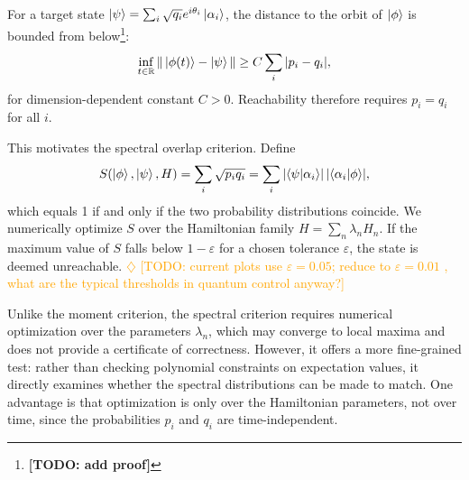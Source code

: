 \documentclass[aps,prx,reprint,superscriptaddress,footnote, twocolumn,notitlepage]{revtex4-2}
\newcommand{\ko}[1]{\textcolor{orange}{#1}}
\newcommand{\todoko}[1]{\ko{$\diamondsuit$ #1}}
\begin{document}
For a target state $\ket{\psi} = \sum_i \sqrt{q_i} e^{i\theta_i} \ket{\alpha_i}$, the distance to the orbit of $\ket{\phi}$ is bounded from below\footnote{\textbf{[TODO: add proof]}}:
\begin{equation}
    \inf_{t \in \mathbb{R}} \| \ket{\phi(t)} - \ket{\psi} \| \geq C \sum_i |p_i - q_i|,
\end{equation}
for dimension-dependent constant $C > 0$. Reachability therefore requires $p_i = q_i$ for all $i$.

This motivates the spectral overlap criterion. Define
\begin{equation}
    S(\ket{\phi}, \ket{\psi}, H) = \sum_i \sqrt{p_i q_i} = \sum_i |\langle \psi | \alpha_i \rangle| \, |\langle \alpha_i | \phi \rangle|,
\end{equation}
which equals 1 if and only if the two probability distributions coincide. We numerically optimize $S$ over the Hamiltonian family $H = \sum_n \lambda_n H_n$. If the maximum value of $S$ falls below $1 - \varepsilon$ for a chosen tolerance $\varepsilon$, the state is deemed unreachable. \todoko{[TODO: current plots use $\varepsilon = 0.05$; reduce to $\varepsilon = 0.01$ , what are the typical thresholds in quantum control anyway?]}

Unlike the moment criterion, the spectral criterion requires numerical optimization over the parameters $\lambda_n$, which may converge to local maxima and does not provide a certificate of correctness. However, it offers a more fine-grained test: rather than checking polynomial constraints on expectation values, it directly examines whether the spectral distributions can be made to match. One advantage is that optimization is only over the Hamiltonian parameters, not over time, since the probabilities $p_i$ and $q_i$ are time-independent.
\end{document}

